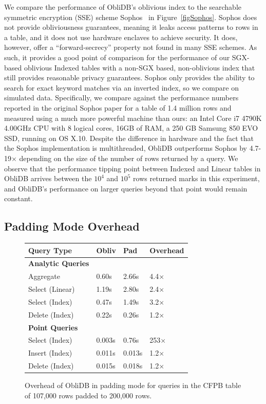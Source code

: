\documentclass[letterpaper,twocolumn,10pt]{article}
\def\name/{ObliDB}
\begin{document}
We compare the performance of \name/'s oblivious index to the searchable symmetric encryption (SSE) scheme Sophos~\cite{Bost16} in Figure~\ref{figSophos}. Sophos does not provide obliviousness guarantees, meaning it leaks access patterns to rows in a table, and it does not use hardware enclaves to achieve security. It does, however, offer a ``forward-secrecy'' property not found in many SSE schemes. As such, it provides a good point of comparison for the performance of our SGX-based oblivious Indexed tables with a non-SGX based, non-oblivious index that still provides reasonable privacy guarantees. Sophos only provides the ability to search for exact keyword matches via an inverted index, so we compare on simulated data. Specifically, we compare against the performance numbers reported in the original Sophos paper for a table of 1.4 million rows and measured using a much more powerful machine than ours: an Intel Core i7 4790K 4.00GHz CPU with 8 logical cores, 16GB of RAM, a 250 GB Samsung 850 EVO SSD, running on OS X.10. Despite the difference in hardware and the fact that the Sophos implementation is multithreaded, \name/ outperforms Sophos by 4.7-19$\times$ depending on the size of the number of rows returned by a query. We observe that the performance tipping point between Indexed and Linear tables in \name/ arrives between the $10^4$ and $10^5$ rows returned marks in this experiment, and \name/'s performance on larger queries beyond that point would remain constant.

\subsection{Padding Mode Overhead}
\begin{figure}
\small
\centering
\begin{tabular}{llll}
\textbf{Query Type} & \textbf{Obliv} & \textbf{Pad} & \textbf{Overhead} \\\hline
\textbf{Analytic Queries}\\
Aggregate & 0.60s & 2.66s & 4.4$\times$\\
Select (Linear) & 1.19s & 2.80s & 2.4$\times$\\
Select (Index) & 0.47s & 1.49s & 3.2$\times$\\
Delete (Index) & 0.22s & 0.26s & 1.2$\times$\\
\textbf{Point Queries}\\
Select (Index) & 0.003s & 0.76s & 253$\times$\\
Insert (Index) & 0.011s & 0.013s & 1.2$\times$\\
Delete (Index) & 0.015s & 0.018s & 1.2$\times$\\
\end{tabular}
\caption{Overhead of \name/ in padding mode for queries in the CFPB table of 107,000 rows padded to 200,000 rows.}
\label{figPad}
\end{figure}
\end{document}
